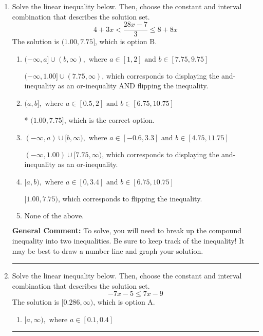 \documentclass{extbook}[14pt]
\newcommand{\litem}[1]{\item #1

\rule{\textwidth}{0.4pt}}
\begin{document}
\begin{enumerate}
{\begin{enumerate}[label=\Alph*.]
You may have chosen this if you thought the inequality did not match the ends of the intervals.
\end{enumerate}

\textbf{General Comment:} Remember that less/greater than or equal to includes the endpoint, while less/greater do not. Also, remember that you need to flip the inequality when you multiply or divide by a negative.
}
\litem{
Solve the linear inequality below. Then, choose the constant and interval combination that describes the solution set.
\[ 4 + 3 x < \frac{28 x - 7}{3} \leq 8 + 8 x \]
The solution is \( (1.00, 7.75] \), which is option B.\begin{enumerate}[label=\Alph*.]
\item \( (-\infty, a] \cup (b, \infty), \text{ where } a \in [1, 2] \text{ and } b \in [7.75, 9.75] \)

$(-\infty, 1.00] \cup (7.75, \infty)$, which corresponds to displaying the and-inequality as an or-inequality AND flipping the inequality.
\item \( (a, b], \text{ where } a \in [0.5, 2] \text{ and } b \in [6.75, 10.75] \)

* $(1.00, 7.75]$, which is the correct option.
\item \( (-\infty, a) \cup [b, \infty), \text{ where } a \in [-0.6, 3.3] \text{ and } b \in [4.75, 11.75] \)

$(-\infty, 1.00) \cup [7.75, \infty)$, which corresponds to displaying the and-inequality as an or-inequality.
\item \( [a, b), \text{ where } a \in [0, 3.4] \text{ and } b \in [6.75, 10.75] \)

$[1.00, 7.75)$, which corresponds to flipping the inequality.
\item \( \text{None of the above.} \)


\end{enumerate}

\textbf{General Comment:} To solve, you will need to break up the compound inequality into two inequalities. Be sure to keep track of the inequality! It may be best to draw a number line and graph your solution.
}
\litem{
Solve the linear inequality below. Then, choose the constant and interval combination that describes the solution set.
\[ -7x -5 \leq 7x -9 \]
The solution is \( [0.286, \infty) \), which is option A.\begin{enumerate}[label=\Alph*.]
\item \( [a, \infty), \text{ where } a \in [0.1, 0.4] \)


\end{enumerate}}
\end{enumerate}
\end{document}
